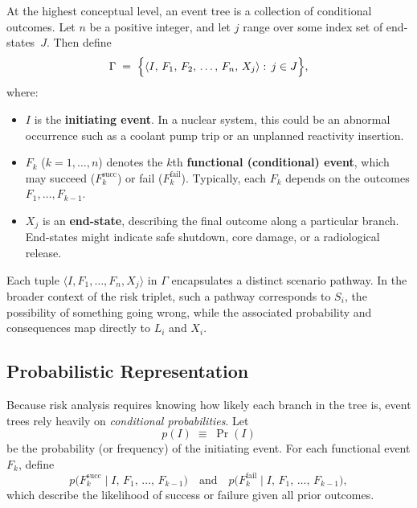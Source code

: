 At the highest conceptual level, an event tree is a collection of conditional outcomes. Let \(n\) be a positive integer, and let \(j\) range over some index set of end-states~\(J\). Then define
\begin{equation}
\label{eq:event_tree_gamma}
    \Gamma
    \;=\;
    \Bigl\{
        \langle
            I,\,
            F_1,\,
            F_2,\,
            \dots,\,
            F_n,\,
            X_j
        \rangle
        :\,
        j \in J
    \Bigr\},
\end{equation}
where:
\begin{itemize}
    \item \(I\) is the \textbf{initiating event}. In a nuclear system, this could be an abnormal occurrence such as a coolant pump trip or an unplanned reactivity insertion.
    \item \(F_k\) (\(k=1,\ldots,n\)) denotes the \(k\)th \textbf{functional (conditional) event}, which may succeed (\(F_k^{\text{succ}}\)) or fail (\(F_k^{\text{fail}}\)). Typically, each \(F_k\) depends on the outcomes \(F_1,\ldots,F_{k-1}\).
    \item \(X_j\) is an \textbf{end-state}, describing the final outcome along a particular branch. End-states might indicate safe shutdown, core damage, or a radiological release.
\end{itemize}
Each tuple \(\langle I, F_1, \dots, F_n, X_j\rangle\) in \(\Gamma\) encapsulates a distinct scenario pathway. In the broader context of the risk triplet, such a pathway corresponds to \(S_i\), the possibility of something going wrong, while the associated probability and consequences map directly to \(L_i\) and \(X_i\).

\subsection{Probabilistic Representation}

Because risk analysis requires knowing how likely each branch in the tree is, event trees rely heavily on \emph{conditional probabilities}. Let
\[
    p(I)
    \;\equiv\;
    \Pr(I)
\]
be the probability (or frequency) of the initiating event. For each functional event \(F_k\), define
\[
    p\bigl(F_k^{\text{succ}}\mid I,\, F_1,\,\dots,\,F_{k-1}\bigr)
    \quad\text{and}\quad
    p\bigl(F_k^{\text{fail}}\mid I,\, F_1,\,\dots,\,F_{k-1}\bigr),
\]
which describe the likelihood of success or failure given all prior outcomes.

